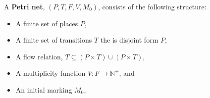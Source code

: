 
\begin{definition}
  \label{def:Petri-Net}
  A \textbf{Petri net}, $(P, T, F, V, M_0)$, consists of the following structure:  
  \begin{itemize}
  \item A finite set of places $P$,
  \item A finite set of transitions $T$ the is disjoint form $P$,
  \item A flow relation, $T \subseteq (P \times T) \cup (P \times T)$,
  \item A multiplicity function $V : F \to \mathbb{N}^+$, and
  \item An initial marking $M_0$,
  \end{itemize}
  
\end{definition}



	
